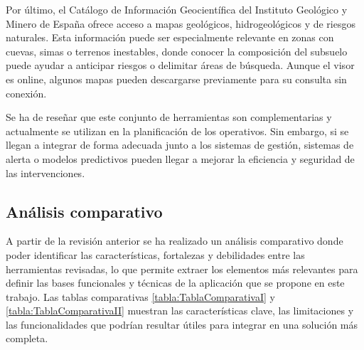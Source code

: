 

    Por último, el Catálogo de Información Geocientífica del Instituto Geológico y Minero de España\cite{IGMECatalogo} ofrece acceso a mapas geológicos, hidrogeológicos y de riesgos naturales. Esta información puede ser especialmente relevante en zonas con cuevas, simas o terrenos inestables, donde conocer la composición del subsuelo puede ayudar a anticipar riesgos o delimitar áreas de búsqueda. Aunque el visor es online, algunos mapas pueden descargarse previamente para su consulta sin conexión.

    Se ha de reseñar que este conjunto de herramientas son complementarias y actualmente se utilizan en la planificación de los operativos. Sin embargo, si se llegan a integrar de forma adecuada junto a los sistemas de gestión, sistemas de alerta o modelos predictivos pueden llegar a mejorar la eficiencia y seguridad de las intervenciones.
    


    \subsection{Análisis comparativo}
    A partir de la revisión anterior se ha realizado un análisis comparativo donde poder identificar las características, fortalezas y debilidades entre las herramientas revisadas, lo que permite extraer los elementos más relevantes para definir las bases funcionales y técnicas de la aplicación que se propone en este trabajo. Las tablas comparativas \ref{tabla:TablaComparativaI} y \ref{tabla:TablaComparativaII} muestran las características clave, las limitaciones y las funcionalidades que podrían resultar útiles para integrar en una solución más completa.
    
